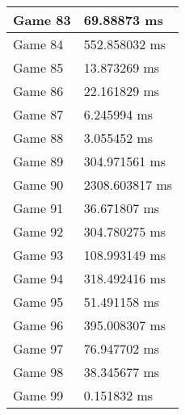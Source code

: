 \begin{tabular}{|l|l|}
	Game 83 & 69.88873 ms \\ \hline
	Game 84 & 552.858032 ms \\ \hline
	Game 85 & 13.873269 ms \\ \hline
	Game 86 & 22.161829 ms \\ \hline
	Game 87 & 6.245994 ms \\ \hline
	Game 88 & 3.055452 ms \\ \hline
	Game 89 & 304.971561 ms \\ \hline
	Game 90 & 2308.603817 ms \\ \hline
	Game 91 & 36.671807 ms \\ \hline
	Game 92 & 304.780275 ms \\ \hline
	Game 93 & 108.993149 ms \\ \hline
	Game 94 & 318.492416 ms \\ \hline
	Game 95 & 51.491158 ms \\ \hline
	Game 96 & 395.008307 ms \\ \hline
	Game 97 & 76.947702 ms \\ \hline
	Game 98 & 38.345677 ms \\ \hline
	Game 99 & 0.151832 ms \\ \hline
\end{tabular}
